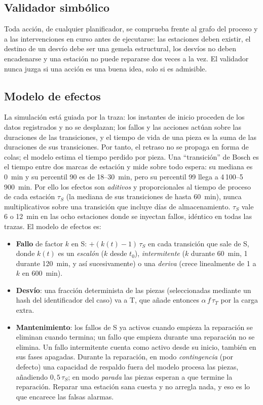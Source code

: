 \documentclass[preprint,11pt]{elsarticle}
\begin{document}
\subsection{Validador simbólico}
Toda acción, de cualquier planificador, se comprueba frente al grafo del proceso y a las intervenciones en curso antes de ejecutarse: las estaciones deben existir, el destino de un desvío debe ser una gemela estructural, los desvíos no deben encadenarse y una estación no puede repararse dos veces a la vez. El validador nunca juzga si una acción es una buena idea, solo si es admisible.

\subsection{Modelo de efectos}
La simulación está guiada por la traza: los instantes de inicio proceden de los datos registrados y no se desplazan; los fallos y las acciones actúan sobre las duraciones de las transiciones, y el tiempo de vida de una pieza es la suma de las duraciones de sus transiciones. Por tanto, el retraso no se propaga en forma de colas; el modelo estima el tiempo perdido por pieza. Una ``transición'' de Bosch es el tiempo entre dos marcas de estación y mide sobre todo espera: su mediana es 0~min y su percentil 90 es de 18--30~min, pero su percentil 99 llega a 4\,100--5\,900~min. Por ello los efectos son \emph{aditivos} y proporcionales al tiempo de proceso de cada estación $\tau_S$ (la mediana de sus transiciones de hasta 60~min), nunca multiplicativos sobre una transición que incluye días de almacenamiento. $\tau_S$ vale 6 o 12~min en las ocho estaciones donde se inyectan fallos, idéntico en todas las trazas. El modelo de efectos es:
\begin{itemize}
  \item \textbf{Fallo} de factor $k$ en S: $+(k(t)-1)\,\tau_S$ en cada transición que sale de S, donde $k(t)$ es un \emph{escalón} ($k$ desde $t_0$), \emph{intermitente} ($k$ durante 60~min, 1 durante 120~min, y así sucesivamente) o una \emph{deriva} (crece linealmente de 1 a $k$ en 600~min).
  \item \textbf{Desvío}: una fracción determinista de las piezas (seleccionadas mediante un hash del identificador del caso) va a T, que añade entonces $\alpha\,f\,\tau_T$ por la carga extra.
  \item \textbf{Mantenimiento}: los fallos de S ya activos cuando empieza la reparación se eliminan cuando termina; un fallo que empieza durante una reparación no se elimina. Un fallo intermitente cuenta como activo desde su inicio, también en sus fases apagadas. Durante la reparación, en modo \emph{contingencia} (por defecto) una capacidad de respaldo fuera del modelo procesa las piezas, añadiendo $0{,}5\,\tau_S$; en modo \emph{parada} las piezas esperan a que termine la reparación. Reparar una estación sana cuesta y no arregla nada, y eso es lo que encarece las falsas alarmas.
\end{itemize}
\end{document}
